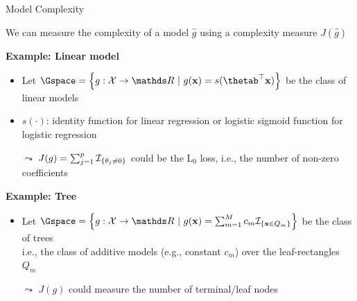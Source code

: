 \documentclass[10pt,compress,t,notes=noshow, xcolor=table]{beamer}
\newcommand{\gh}{\hat{g}}
\begin{document}
\begin{frame}{Model Complexity}
    
    We can measure the complexity of a model $\gh$ using a complexity measure $J(\gh)$ \lz

 	\textbf{Example: Linear model}\\
 	\begin{itemize}
 	    \item Let $\Gspace = \left\{g: \Xspace \to \R ~|~g(\xv) = s(\thetab^\top \xv)\right\}$ be the class of linear models
 	    \item $s(\cdot)$: identity function for linear regression or logistic sigmoid function for logistic regression
 	    \item[$\leadsto$] $J(g) = \sum_{j = 1}^p \mathcal{I}_{\{ \theta_j \neq 0 \}}$ could be the L$_0$ loss, i.e., the number of non-zero coefficients 
 	\end{itemize}
 	\lz\pause
 	
 	\textbf{Example: Tree}\\
 	\begin{itemize}
 	    \item Let $\Gspace = \left\{g:\Xspace \to \R ~|~g(\xv) = \sum_{m=1}^M c_m \ind_{\{ \xv \in Q_m \}}\right\}$ be the class of trees\\
 	     i.e., the class of additive models (e.g., constant $c_m$)  over the leaf-rectangles $Q_m$
 	    \item[$\leadsto$] $J(g)$ could measure the number of terminal/leaf nodes
 	\end{itemize}
 	
\end{frame}
 
\end{document}
